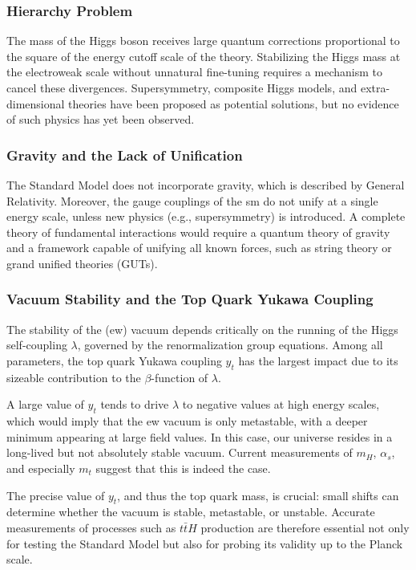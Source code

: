 \subsubsection*{Hierarchy Problem}

The mass of the Higgs boson receives large quantum corrections proportional to the square of the energy cutoff scale of the theory. Stabilizing the Higgs mass at the electroweak scale without unnatural fine-tuning requires a mechanism to cancel these divergences. Supersymmetry, composite Higgs models, and extra-dimensional theories have been proposed as potential solutions, but no evidence of such physics has yet been observed.

\subsubsection*{Gravity and the Lack of Unification}

The Standard Model does not incorporate gravity, which is described by General Relativity. Moreover, the gauge couplings of the \acrshort{sm} do not unify at a single energy scale, unless new physics (e.g., supersymmetry) is introduced. A complete theory of fundamental interactions would require a quantum theory of gravity and a framework capable of unifying all known forces, such as string theory or grand unified theories (GUTs).

\subsubsection*{Vacuum Stability and the Top Quark Yukawa Coupling}
The stability of the (\acrshort{ew}) vacuum depends critically on the running of the Higgs self-coupling $\lambda$, governed by the renormalization group equations. Among all parameters, the top quark Yukawa coupling $y_t$ has the largest impact due to its sizeable contribution to the $\beta$-function of $\lambda$.

A large value of $y_t$ tends to drive $\lambda$ to negative values at high energy scales, which would imply that the \acrshort{ew} vacuum is only metastable, with a deeper minimum appearing at large field values. In this case, our universe resides in a long-lived but not absolutely stable vacuum. Current measurements of $m_H$, $\alpha_s$, and especially $m_t$ suggest that this is indeed the case.

The precise value of $y_t$, and thus the top quark mass, is crucial: small shifts can determine whether the vacuum is stable, metastable, or unstable. Accurate measurements of processes such as $t\bar{t}H$ production are therefore essential not only for testing the Standard Model but also for probing its validity up to the Planck scale.



